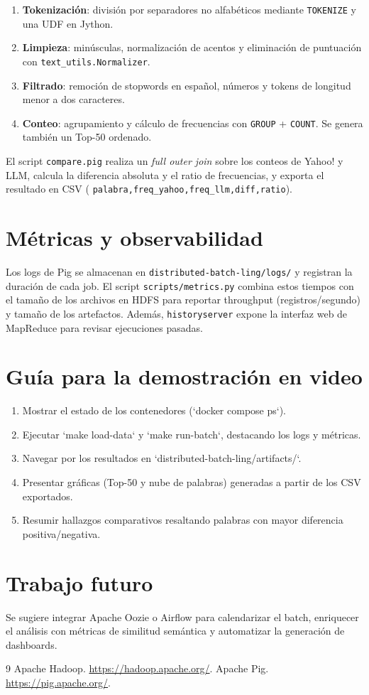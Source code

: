 \documentclass[11pt,a4paper]{article}
\begin{document}
\begin{enumerate}
  \item \textbf{Tokenización}: división por separadores no alfabéticos mediante \texttt{TOKENIZE} y una UDF en Jython.
  \item \textbf{Limpieza}: minúsculas, normalización de acentos y eliminación de puntuación con \texttt{text\_utils.Normalizer}.
  \item \textbf{Filtrado}: remoción de stopwords en español, números y tokens de longitud menor a dos caracteres.
  \item \textbf{Conteo}: agrupamiento y cálculo de frecuencias con \texttt{GROUP} + \texttt{COUNT}. Se genera también un Top-50 ordenado.
\end{enumerate}

El script \texttt{compare.pig} realiza un \emph{full outer join} sobre los conteos de Yahoo! y LLM, calcula la diferencia absoluta y el ratio de frecuencias, y exporta el resultado en CSV (
\texttt{palabra,freq\_yahoo,freq\_llm,diff,ratio}).

\section{Métricas y observabilidad}
Los logs de Pig se almacenan en \texttt{distributed-batch-ling/logs/} y registran la duración de cada job. El script \texttt{scripts/metrics.py} combina estos tiempos con el tamaño de los archivos en HDFS para reportar throughput (registros/segundo) y tamaño de los artefactos. Además, \texttt{historyserver} expone la interfaz web de MapReduce para revisar ejecuciones pasadas.

\section{Guía para la demostración en video}
\begin{enumerate}
  \item Mostrar el estado de los contenedores (`docker compose ps`).
  \item Ejecutar `make load-data` y `make run-batch`, destacando los logs y métricas.
  \item Navegar por los resultados en `distributed-batch-ling/artifacts/`.
  \item Presentar gráficas (Top-50 y nube de palabras) generadas a partir de los CSV exportados.
  \item Resumir hallazgos comparativos resaltando palabras con mayor diferencia positiva/negativa.
\end{enumerate}

\section{Trabajo futuro}
Se sugiere integrar Apache Oozie o Airflow para calendarizar el batch, enriquecer el análisis con métricas de similitud semántica y automatizar la generación de dashboards.


\begin{thebibliography}{9}
 Apache Hadoop. \url{https://hadoop.apache.org/}.
 Apache Pig. \url{https://pig.apache.org/}.
\end{thebibliography}
\end{document}
